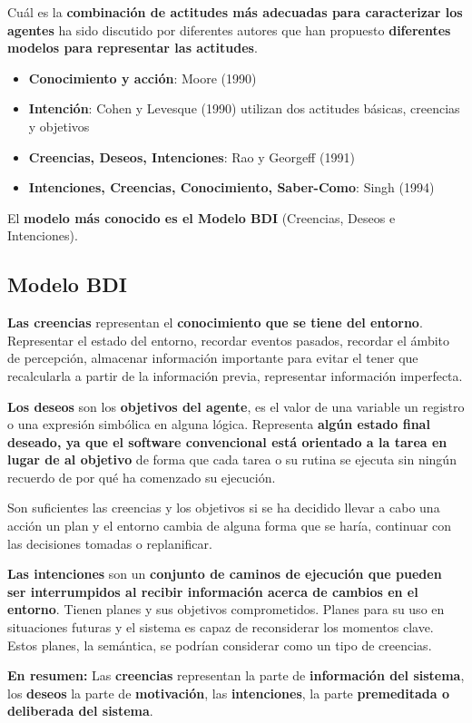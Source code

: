 \documentclass[12pt, twoside, openright]{report} %
\begin{document}
Cuál es la \textbf{combinación de actitudes más adecuadas para caracterizar los agentes} ha sido discutido por diferentes autores que han propuesto \textbf{diferentes modelos para representar las actitudes}.
\begin{itemize}
	\item \textbf{Conocimiento y acción}: Moore (1990)
	\item \textbf{Intención}: Cohen y Levesque (1990) utilizan dos actitudes básicas, creencias y objetivos
	\item \textbf{Creencias, Deseos, Intenciones}: Rao y Georgeff (1991)
	\item \textbf{Intenciones, Creencias, Conocimiento, Saber-Como}: Singh (1994)
\end{itemize}

El \textbf{modelo más conocido es el Modelo BDI} (Creencias, Deseos e Intenciones).

\subsection{Modelo BDI}
\textbf{Las creencias} representan el \textbf{conocimiento que se tiene del entorno}. Representar el estado del entorno, recordar eventos pasados, recordar el ámbito de percepción, almacenar información importante para evitar el tener que recalcularla a partir de la información previa, representar información imperfecta. 

\textbf{Los deseos} son los \textbf{objetivos del agente}, es el valor de una variable un registro o una expresión simbólica en alguna lógica. Representa \textbf{algún estado final deseado, ya que el software convencional está orientado a la tarea en lugar de al objetivo} de forma que cada tarea o su rutina se ejecuta sin ningún recuerdo de por qué ha comenzado su ejecución.

Son suficientes las creencias y los objetivos si se ha decidido llevar a cabo una acción un plan y el entorno cambia de alguna forma que se haría, continuar con las decisiones tomadas o replanificar.

\textbf{Las intenciones} son un \textbf{conjunto de caminos de ejecución que pueden ser interrumpidos al recibir información acerca de cambios en el entorno}. Tienen planes y sus objetivos comprometidos. Planes para su uso en situaciones futuras y el sistema es capaz de reconsiderar los momentos clave. Estos planes, la semántica, se podrían considerar como un tipo de creencias.

\textbf{En resumen:} Las \textbf{creencias} representan la parte de \textbf{información del sistema}, los \textbf{deseos} la parte de \textbf{motivación}, las \textbf{intenciones}, la parte \textbf{premeditada o deliberada del sistema}.
\end{document}
